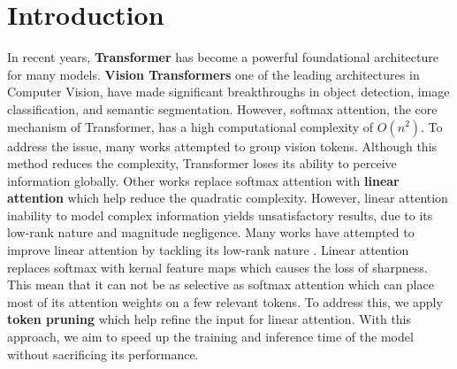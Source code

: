 \section{Introduction}

In recent years, \textbf{Transformer} \cite{vaswani2017attention} has become a powerful foundational architecture for many models.
\textbf{Vision Transformers} \cite{dosovitskiy2020image} one of the leading architectures in Computer Vision, have made significant breakthroughs
in object detection, image classification, and semantic segmentation.
However, softmax attention, the core mechanism of Transformer, has a high computational complexity of \( O(n^2) \).
To address the issue, many works attempted to group vision tokens. Although this method reduces the complexity,
Transformer loses its ability to perceive information globally.
Other works replace softmax attention with \textbf{linear attention} which help reduce the quadratic complexity.
However, linear attention inability to model complex information yields unsatisfactory results, due to its low-rank nature and magnitude negligence.
Many works have attempted to improve linear attention by tackling its low-rank nature \cite{fan2025breaking}.
Linear attention replaces softmax with kernal feature maps which causes the loss of sharpness.
This mean that it can not be as selective as softmax attention which can place most of its attention weights on a few relevant tokens.
To address this, we apply \textbf{token pruning} \cite{rao2021dynamicvit,lu2025reinforcement} which help refine the input for linear attention.
With this approach, we aim to speed up the training and inference time of the model without sacrificing its performance.

